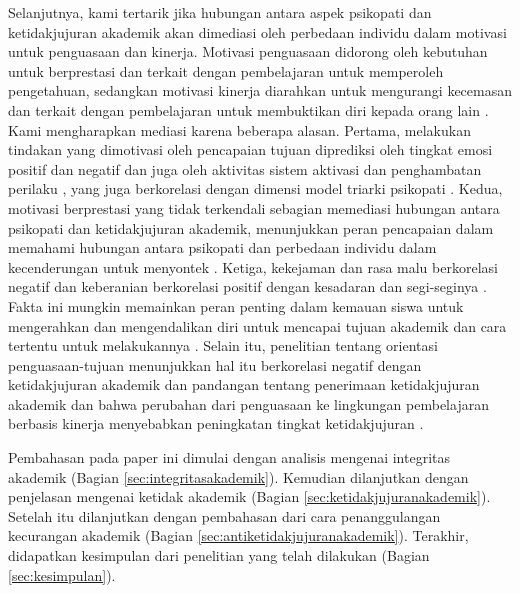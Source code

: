Selanjutnya, kami tertarik jika hubungan antara aspek psikopati dan ketidakjujuran akademik akan dimediasi oleh perbedaan individu dalam motivasi untuk penguasaan dan kinerja. Motivasi penguasaan didorong oleh kebutuhan untuk berprestasi dan terkait dengan pembelajaran untuk memperoleh pengetahuan, sedangkan motivasi kinerja diarahkan untuk mengurangi kecemasan dan terkait dengan pembelajaran untuk membuktikan diri kepada orang lain \citep{elliot2008measurement}. Kami mengharapkan mediasi karena beberapa alasan. Pertama, melakukan tindakan yang dimotivasi oleh pencapaian tujuan diprediksi oleh tingkat emosi positif dan negatif dan juga oleh aktivitas sistem aktivasi dan penghambatan perilaku \citep{elliot2002approach}, yang juga berkorelasi dengan dimensi model triarki psikopati \citep{sellbom2013examination}. Kedua, motivasi berprestasi yang tidak terkendali sebagian memediasi hubungan antara psikopati dan ketidakjujuran akademik, menunjukkan peran pencapaian dalam memahami hubungan antara psikopati dan perbedaan individu dalam kecenderungan untuk menyontek \citep{williams2010identifying}. Ketiga, kekejaman dan rasa malu berkorelasi negatif dan keberanian berkorelasi positif dengan kesadaran dan segi-seginya \citep{poy2014ffm} \citep{pilch2015polska}. Fakta ini mungkin memainkan peran penting dalam kemauan siswa untuk mengerahkan dan mengendalikan diri untuk mencapai tujuan akademik dan cara tertentu untuk melakukannya \citep{mccabe2013big}. Selain itu, penelitian tentang orientasi penguasaan-tujuan menunjukkan hal itu berkorelasi negatif dengan ketidakjujuran akademik dan pandangan tentang penerimaan ketidakjujuran akademik \citep{bong2014perfectionism} \citep{van2011win} \citep{yang2013investigation} dan bahwa perubahan dari penguasaan ke lingkungan pembelajaran berbasis kinerja menyebabkan peningkatan tingkat ketidakjujuran \citep{anderman2004changes}.

Pembahasan pada paper ini dimulai dengan analisis mengenai integritas akademik (Bagian \ref{sec:integritasakademik}).
Kemudian dilanjutkan dengan penjelasan mengenai ketidak akademik (Bagian \ref{sec:ketidakjujuranakademik}).
Setelah itu dilanjutkan dengan pembahasan dari cara penanggulangan kecurangan akademik (Bagian \ref{sec:antiketidakjujuranakademik}).
Terakhir, didapatkan kesimpulan dari penelitian yang telah dilakukan (Bagian \ref{sec:kesimpulan}).
